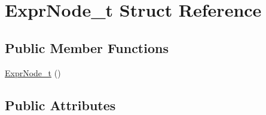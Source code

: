 \hypertarget{structExprNode__t}{\section{Expr\-Node\-\_\-t Struct Reference}
\label{structExprNode__t}
}
\subsection*{Public Member Functions}
\begin{DoxyCompactItemize}
\item 
\hyperlink{structExprNode__t_af2466e5b5d61954ea551fd461fdd7630}{Expr\-Node\-\_\-t} ()
\end{DoxyCompactItemize}
\subsection*{Public Attributes}
